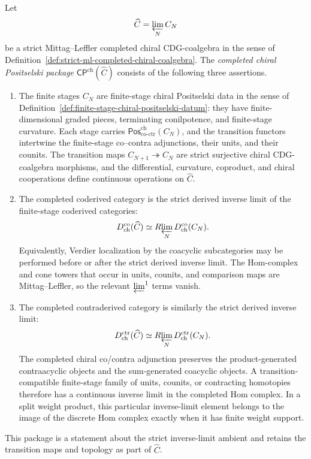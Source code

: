 \begin{definition}
\label{def:completed-chiral-positselski-package}
Let
\[
\widehat C=\varprojlim_N C_N
\]
be a strict Mittag--Leffler completed chiral CDG-coalgebra in the sense
of Definition~\ref{def:strict-ml-completed-chiral-coalgebra}. The
\emph{completed chiral Positselski package}
\(\mathsf{CP}^{\mathrm{ch}}(\widehat C)\) consists of the following
three assertions.
\begin{enumerate}
\item[\textup{(CP1)}] The finite stages \(C_N\) are finite-stage
 chiral Positselski data in the sense of
 Definition~\ref{def:finite-stage-chiral-positselski-datum}: they have
 finite-dimensional graded pieces, terminating conilpotence, and
 finite-stage curvature.  Each stage carries
 \(\mathsf{Pos}^{\mathrm{ch}}_{\mathrm{co\text{-}ctr}}(C_N)\), and
 the transition functors intertwine the finite-stage co--contra
 adjunctions, their units, and their counits.  The transition maps
 \(C_{N+1}\twoheadrightarrow C_N\) are strict surjective chiral
 CDG-coalgebra morphisms, and the differential, curvature, coproduct,
 and chiral cooperations define continuous operations on
 \(\widehat C\).
\item[\textup{(CP2)}] The completed coderived category is the strict
 derived inverse limit of the finite-stage coderived categories:
 \[
 D^{\mathrm{co}}_{\mathrm{ch}}(\widehat C)
 \simeq
 R\!\varprojlim_N D^{\mathrm{co}}_{\mathrm{ch}}(C_N).
 \]
 Equivalently, Verdier localization by the coacyclic subcategories may
 be performed before or after the strict derived inverse limit. The
 Hom-complex and cone towers that occur in units, counits, and
 comparison maps are Mittag--Leffler, so the relevant
 \(\varprojlim^1\) terms vanish.
\item[\textup{(CP3)}] The completed contraderived category is similarly
 the strict derived inverse limit:
 \[
 D^{\mathrm{ctr}}_{\mathrm{ch}}(\widehat C)
 \simeq
 R\!\varprojlim_N D^{\mathrm{ctr}}_{\mathrm{ch}}(C_N).
 \]
 The completed chiral co/contra adjunction preserves the
 product-generated contraacyclic objects and the sum-generated
 coacyclic objects. A transition-compatible finite-stage family of
 units, counits, or contracting homotopies therefore has a continuous
 inverse limit in the completed Hom complex.  In a split weight
 product, this particular inverse-limit element belongs to the image
 of the discrete Hom complex exactly when it has finite weight
 support.
\end{enumerate}
This package is a statement about the strict inverse-limit ambient and
retains the transition maps and topology as part of \(\widehat C\).
\end{definition}

